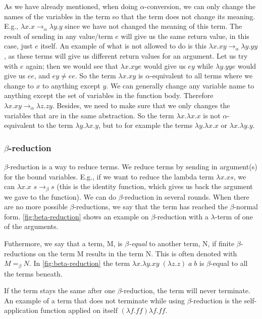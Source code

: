 \para
As we have already mentioned, when doing $\alpha$-conversion, we can only change the names of the variables in the term so that the term does not change its meaning. 
E.g., $\lambda x.x \rightarrow_\alpha \lambda y.y$ since we have not changed the meaning of this term. The result of sending in any value/term $e$ will give us the same return value, in this case, just $e$ itself. An example of what is not allowed to do is this $\lambda x.xy \rightarrow_\alpha \lambda y.yy$, as these terms will give us different return values for an argument. Let us try with $e$ again; then we would see that  $\lambda x.xy e$ would give us $ey$ while $\lambda y.yy e$ would give us $ee$, and $ey \neq ee$. So the term $\lambda x.xy$ is $\alpha$-equivalent to all terms where we change to $x$ to anything except $y$. We can generally change any variable name to anything except the set of variables in the function body. Therefore $\lambda x.xy \rightarrow_\alpha \lambda z.zy$. Besides, we need to make sure that we only changes the variables that are in the same abstraction. So the term $\lambda x.\lambda x.x $ is not $\alpha$-equivalent to the 
term $\lambda y.\lambda x.y$, but to for example the terms $\lambda y.\lambda x.x$ or $\lambda x.\lambda y.y$.

\subsubsection{$\beta$-reduction}
$\beta$-reduction is a way to reduce terms. We reduce terms by sending in argument(s) for the bound variables. E.g., if we want to reduce the lambda term $\lambda x. x s$, 
we can $\lambda x. x$  $s \rightarrow _\beta s$ (this is the identity function, which gives us back the argument we gave to the function). We can do $\beta$-reduction in several rounds. When there are no more possible $\beta$-reductions, we say that the term has reached the $\beta$-normal form. \autoref{fig:beta-reduction} shows an example on $\beta$-reduction with a $\lambda$-term of one of the arguments. 

\para
Futhermore, we say that a term, M, is \emph{$\beta$-equal} to another term, N, if finite $\beta$-reductions on the term M results in the term N. This is often denoted with $M =_{\beta} N$. In \autoref{fig:beta-reduction} the term $\lambda x.\lambda y. xy \; (\lambda z.z) \; a \; b$ is $\beta$-equal to all the terms beneath. 

\para
If the term stays the same after one $\beta$-reduction, the term will never terminate. An example of a term that does not terminate while using $\beta$-reduction is the self-application function applied on itself $(\lambda f.ff) \lambda f.ff$.

